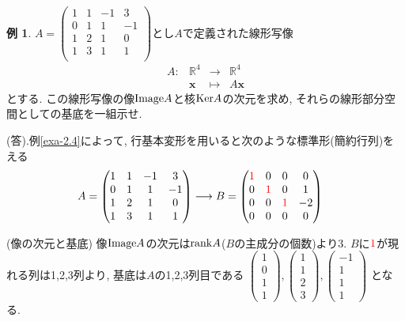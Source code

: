 \documentclass[dvipdfmx,a4paper,11pt]{article}
\newcommand{\R}{\mathbb{R}}
\theoremstyle{definition}
\newtheorem{exa}[thm]{例}
\newcommand{\xr}[1]{\textcolor{red}{#1}}
\begin{document}
  \begin{exa}\cite[例題2.5]{M}
  $A=
\begin{pmatrix}
1 & 1&-1&3\\
0 & 1&1&-1\\
1 & 2&1&0\\
1 & 3&1&1\\
 \end{pmatrix}
 $とし$A$で定義された線形写像
    $$
\begin{array}{cccc}
A:&  \R^4&\rightarrow& \R^4 \\
& \bm{x}&\longmapsto & A\bm{x}
\end{array}
$$
とする.
この線形写像の像${\rm Image}A$と核${\rm Ker}A$の次元を求め, それらの線形部分空間としての基底を一組示せ. 
 
 (答).例\ref{exa-2.4}によって,  行基本変形を用いると次のような標準形(簡約行列)をえる
 \begin{align*}
 &A=\begin{pmatrix}
1 & 1&-1&3\\
0 & 1&1&-1\\
1 & 2&1&0\\
1 & 3&1&1\\
 \end{pmatrix}
 \overset{}{\longrightarrow} 
B=\begin{pmatrix}
\xr{1} & 0&0&0\\
0 & \xr{1}&0&1\\
0 & 0&\xr{1}&-2\\
0& 0&0&0\\
 \end{pmatrix}
 \end{align*}
 
(像の次元と基底)
 像${\rm Image}A$の次元は${\rm rank}A$($B$の主成分の個数)より3.
$B$に$\xr{1}$が現れる列は1,2,3列より, 基底は$A$の1,2,3列目である
$
\begin{pmatrix}
1\\0\\1\\1
\end{pmatrix}, 
\begin{pmatrix}
1\\1\\2\\3
\end{pmatrix}, 
\begin{pmatrix}
-1\\1\\1\\1
\end{pmatrix}
$
となる.


\end{exa}
\end{document}
